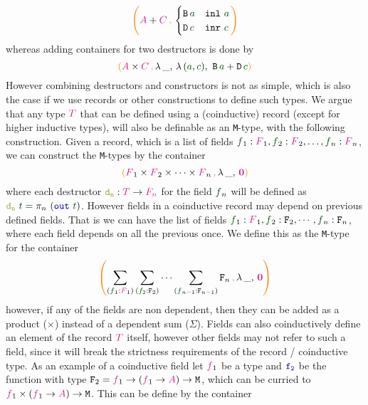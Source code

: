 \documentclass[twoside,11pt,openright]{report}
\theoremstyle{plain} %
\theoremstyle{definition}
\theoremstyle{remark}
\newcommand*{\term}[1]{\textcolor{green!30!black}{#1}} %
\newcommand*{\type}[1]{\textcolor{magenta!90!black}{#1}}
\newcommand*{\containerpair}[2]{\ensuremath{\colorlet{savedleftcolor}{.}\color{orange}\left(\color{savedleftcolor}#1\,\textcolor{orange}{\mathbf{,}}\,#2\color{orange}\right)\color{savedleftcolor}}}
\newcommand*{\containerpairsimple}[2]{\containerpair{#1}{\lambda\,\_,\,#2}}
\newcommand*{\empt}{\type{\textbf{0}}}
\newcommand*{\function}[1]{\textcolor{blue!60!black}{\ensuremath{\mathtt{#1}}}}
\newcommand*{\destructor}[1]{\textcolor{yellow!60!black}{\ensuremath{\mathtt{#1}}}}
\newcommand*{\typeformer}[1]{\ensuremath{\mathtt{#1}}}
\begin{document}
\begin{equation}
  \containerpair{\type{A} + \type{C}}{ \begin{cases} \typeformer{B}\,\term{a} & \mathtt{inl}~\term{a} \\ \typeformer{D}\,\term{c} & \mathtt{inr}~\term{c} \end{cases}}
\end{equation}
whereas adding containers for two destructors is done by
\begin{equation}
  \containerpairsimple{\type{A} \times \type{C}}{\lambda\,(\term{a},\term{c}),~\typeformer{B}\,\term{a} + \typeformer{D}\,\term{c}}  
\end{equation}
However combining destructors and constructors is not as simple, which is also the case if we use records or other constructions to define such types. We argue that any type \(\type{T}\) that can be defined using a (coinductive) record (except for higher inductive types), will also be definable as an \texttt{M}-type, with the following construction. Given a record, which is a list of fields \(\term{f}_1 : \type{F}_1,\term{f}_2 : \type{F}_2,\dots,\term{f}_n : \type{F}_n\), we can construct the \texttt{M}-types by the container
\begin{equation}
  \containerpairsimple{\type{F}_1 \times \type{F}_2 \times \dots \times \type{F}_n}{\empt}
\end{equation}
where each destructor \(\destructor{d_n} : \type{T} \rightarrow \type{F_n}\) for the field \(\term{f}_n\) will be defined as \(\destructor{d_n}~\term{t} = \pi_n~(\function{out}~\term{t})\). However fields in a coinductive record may depend on previous defined fields. That is we can have the list of fields \(\term{f}_1 : \type{F}_1,\term{f}_2 : \typeformer{F}_2,\cdots,\term{f}_n : \typeformer{F}_n\), where each field depends on all the previous once. We define this as the \texttt{M}-type for the container
\begin{equation}
  \containerpairsimple{\sum_{(\term{f}_1 : \type{F}_1)} \sum_{(\term{f_2} : \typeformer{F}_2)} \cdots \sum_{(\term{f}_{n-1} : \typeformer{F}_{n-1})}\typeformer{F}_n}{\empt}
\end{equation}
however, if any of the fields are non dependent, then they can be added as a product (\(\times\)) instead of a dependent sum (\(\Sigma\)). Fields can also coinductively define an element of the record \(\type{T}\) itself, however other fields may not refer to such a field, since it will break the strictness requirements of the record / coinductive type. As an example of a coinductive field let \(\type{f}_1\) be a type and \(\function{f_2}\) be the function with type \(\typeformer{F}_2 = \type{f}_1 \rightarrow (\type{f}_1 \rightarrow \type{A}) \rightarrow \typeformer{M}\), which can be curried to \(\type{f}_1 \times (\type{f}_1 \rightarrow \type{A}) \rightarrow \typeformer{M}\). This can be define by the container
\end{document}
